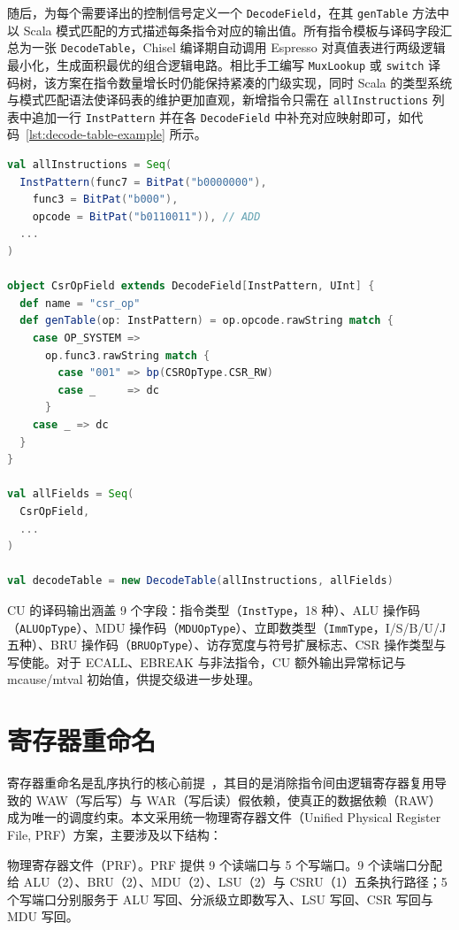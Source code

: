 随后，为每个需要译出的控制信号定义一个 \lstinline|DecodeField|，在其 \lstinline|genTable| 方法中以 Scala 模式匹配的方式描述每条指令对应的输出值。所有指令模板与译码字段汇总为一张 \lstinline|DecodeTable|，Chisel 编译期自动调用 Espresso 对真值表进行两级逻辑最小化，生成面积最优的组合逻辑电路。相比手工编写 \lstinline|MuxLookup| 或 \lstinline|switch| 译码树，该方案在指令数量增长时仍能保持紧凑的门级实现，同时 Scala 的类型系统与模式匹配语法使译码表的维护更加直观，新增指令只需在 \lstinline|allInstructions| 列表中追加一行 \lstinline|InstPattern| 并在各 \lstinline|DecodeField| 中补充对应映射即可，如代码~\ref{lst:decode-table-example} 所示。

\begin{lstlisting}[language=Scala,caption={DecodeTable 指令模板与字段汇总示例},label={lst:decode-table-example}]
val allInstructions = Seq(
  InstPattern(func7 = BitPat("b0000000"),
    func3 = BitPat("b000"),
    opcode = BitPat("b0110011")), // ADD
  ...
)

object CsrOpField extends DecodeField[InstPattern, UInt] {
  def name = "csr_op"
  def genTable(op: InstPattern) = op.opcode.rawString match {
    case OP_SYSTEM =>
      op.func3.rawString match {
        case "001" => bp(CSROpType.CSR_RW)
        case _     => dc
      }
    case _ => dc
  }
}

val allFields = Seq(
  CsrOpField,
  ...
)

val decodeTable = new DecodeTable(allInstructions, allFields)
\end{lstlisting}

CU 的译码输出涵盖 9 个字段：指令类型（\lstinline|InstType|，18 种）、ALU 操作码（\lstinline|ALUOpType|）、MDU 操作码（\lstinline|MDUOpType|）、立即数类型（\lstinline|ImmType|，I/S/B/U/J 五种）、BRU 操作码（\lstinline|BRUOpType|）、访存宽度与符号扩展标志、CSR 操作类型与写使能。对于 ECALL、EBREAK 与非法指令，CU 额外输出异常标记与 mcause/mtval 初始值，供提交级进一步处理。

\section{寄存器重命名}

寄存器重命名是乱序执行的核心前提~\cite{tomasulo1967algorithm}，其目的是消除指令间由逻辑寄存器复用导致的 WAW（写后写）与 WAR（写后读）假依赖，使真正的数据依赖（RAW）成为唯一的调度约束。本文采用统一物理寄存器文件（Unified Physical Register File, PRF）方案，主要涉及以下结构：

物理寄存器文件（PRF）。PRF 提供 9 个读端口与 5 个写端口。9 个读端口分配给 ALU（2）、BRU（2）、MDU（2）、LSU（2）与 CSRU（1）五条执行路径；5 个写端口分别服务于 ALU 写回、分派级立即数写入、LSU 写回、CSR 写回与 MDU 写回。

